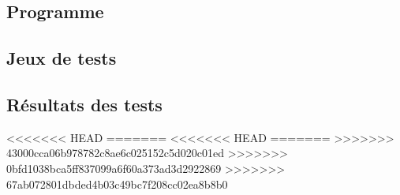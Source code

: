 \documentclass{report}
\begin{document}
      \subsection{Programme}
        
      \newpage
      \subsection{Jeux de tests}
        \renewcommand{\arraystretch}{2}
      \subsection{Résultats des tests}
<<<<<<< HEAD
=======
<<<<<<< HEAD
      \renewcommand{\arraystretch}{2}
=======
>>>>>>> 43000cca06b978782c8ae6c025152c5d020c01ed
>>>>>>> 0bfd1038bca5ff837099a6f60a373ad3d2922869
>>>>>>> 67ab072801dbded4b03c49bc7f208cc02ea8b8b0
\end{document}
